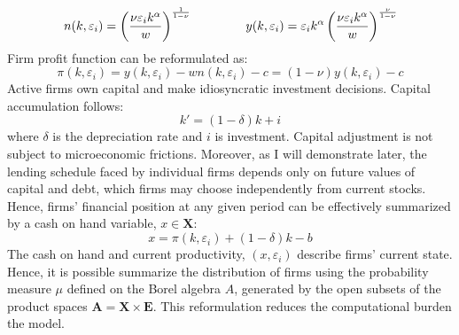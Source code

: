 \documentclass[12pt]{article}
\begin{document}
\begin{equation} \label{eq:opt_emp_prod}
n(k,\varepsilon_i) = \left( \dfrac{ \nu \varepsilon_i k^\alpha}{w} \right)^{\frac{1}{1-\nu}} \hspace{15mm}
y(k,\varepsilon_i) = \varepsilon_i k^{\alpha} \left( \dfrac{\nu \varepsilon_i k^\alpha}{w} \right)^{\frac{\nu}{1-\nu}}
\end{equation}  
Firm profit function can be reformulated as: 
\begin{equation} \label{eq:profit}
\pi(k,\varepsilon_i) = y(k,\varepsilon_i) - wn(k,\varepsilon_i) - c = (1-\nu) y(k,\varepsilon_i) - c
\end{equation} 
Active firms own capital and make idiosyncratic investment decisions. Capital accumulation follows: 
\begin{equation} \label{eq:capital}
k' = (1-\delta)k + i
\end{equation} 
where $\delta$ is the depreciation rate and $i$ is investment. Capital adjustment is not subject to microeconomic frictions. Moreover, as I will demonstrate later, the lending schedule faced by individual firms depends only on future values of capital and debt, which firms may choose independently from current stocks. Hence, firms' financial position at any given period can be effectively summarized by a cash on hand variable, $x \in \mathbf{X}$: 
\begin{equation} \label{eq:cash on hand}
    x = \pi(k,\varepsilon_i) + (1-\delta)k - b 
\end{equation}
The cash on hand and current productivity, $(x, \varepsilon_i)$ describe firms' current state. Hence, it is possible summarize the distribution of firms using the probability measure $\mu$ defined on the Borel algebra $A$, generated by the open subsets of the product spaces $ \mathbf{A} = \mathbf{X} \times \mathbf{E} $.  This reformulation reduces the computational burden the model. 
\end{document}
